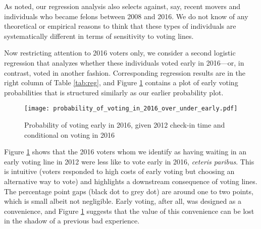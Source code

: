 \documentclass[12pt,titlepage]{article}
\begin{document}
As noted, our regression analysis also selects against, say, recent
movers and individuals who became felons between 2008 and 2016.  We do
not know of any theoretical or empirical reasons to think that these
types of individuals are systematically different in terms of
sensitivity to voting lines.




Now restricting attention to 2016 voters only, we consider a second
logistic regression that analyzes whether these individuals voted
early in 2016---or, in contrast, voted in another fashion.
Corresponding regression results are in the right column of Table
\ref{tab:reg}, and Figure \ref{fig:prvotingearly2016} contains a plot
of early voting probabilities that is structured similarly as our
earlier probability plot.

\begin{figure}[!ht]
\caption{Probability of voting early in 2016, given 2012 check-in time
and conditional on voting in 2016}
  \label{fig:prvotingearly2016}
  \centering
    \centering\texttt{[image: probability\_of\_voting\_in\_2016\_over\_under\_early.pdf]}
\end{figure}

Figure \ref{fig:prvotingearly2016} shows that the 2016 voters whom we
identify as having waiting in an early voting line in 2012 were less
like to vote early in 2016, \emph{ceteris paribus}.  This is intuitive
(voters responded to high costs of early voting but choosing an
alternative way to vote) and highlights a downstream consequence of
voting lines.  The percentage point gaps (black dot to grey dot) are
around one to two points, which is small albeit not negligible.  Early
voting, after all, was designed as a convenience, and Figure
\ref{fig:prvotingearly2016} suggests that the value of this
convenience can be lost in the shadow of a previous bad experience.
\end{document}

